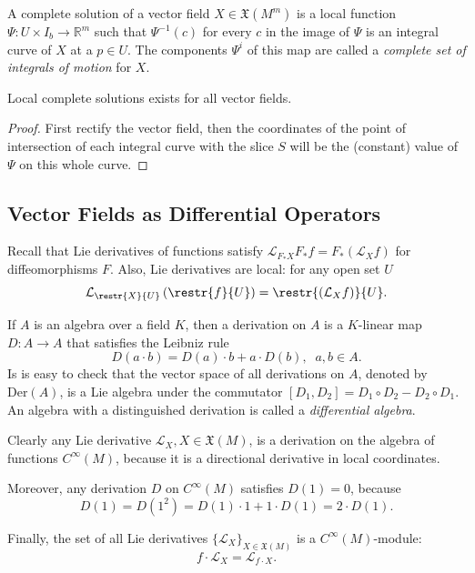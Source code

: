 \documentclass[english,letterpaper]{article}%
\numberwithin{equation}{section}
\numberwithin{figure}{section}
\numberwithin{table}{section}
\theoremstyle{definition}
\theoremstyle{definition}
\theoremstyle{definition}
\theoremstyle{plain}
\theoremstyle{plain}
\theoremstyle{plain}
\theoremstyle{plain}
\theoremstyle{remark}
\theoremstyle{remark}
\newcommand{\Lie}{\mathcal{L}}
\newcommand{\fX}{\mathfrak{X}}
\begin{document}
\begin{defn}
A complete solution of a vector field $X\in \fX(M^m)$ is a local function $\Psi:U\times I_b\to\mathbb{R}^m$ such that $\Psi^{-1}(c)$ for every $c$ in the image of $\Psi$ is an integral curve of $X$ at a $p\in U$. The components $\Psi^i$ of this map are called a \emph{complete set of integrals of motion} for $X$.
\end{defn}
\begin{prop}
Local complete solutions exists for all vector fields.
\end{prop}
\begin{proof}
First rectify the vector field, then the coordinates of the point of intersection of each integral curve with the slice $S$ will be the (constant) value of $\Psi$ on this whole curve.
\end{proof}




\subsection{Vector Fields as Differential Operators}

Recall that Lie derivatives of functions satisfy $\Lie_{F_\ast X}F_\ast f=F_\ast(\Lie_X f)$ for diffeomorphisms $F$. Also, Lie derivatives are local: for any open set $U$
\[\Lie_{\restr{X}{U}}\left(\restr{f}{U}\right)=\restr{\left(\Lie_X f\right)}{U}.\]

\begin{defn}[Derivations]
If $A$ is an algebra over a field $K$, then a derivation on $A$ is a $K$-linear map $D:A\to A$ that satisfies the Leibniz rule
\[D(a\cdot b)=D(a)\cdot b+a\cdot D(b),\;\; a,b\in A.\]
Is is easy to check that the vector space of all derivations on $A$, denoted by $\mathrm{Der}(A)$, is a Lie algebra under the commutator $[D_1,D_2]=D_1\circ D_2-D_2\circ D_1$.
An algebra with a distinguished derivation is called a \emph{differential algebra}.
\end{defn}

Clearly any Lie derivative $\Lie_X, X\in\fX(M)$, is a derivation on the algebra of functions $C^\infty(M)$, because it is a directional derivative in local coordinates.

Moreover, any derivation $D$ on $C^\infty(M)$ satisfies $D(1)=0$, because
\[D(1)=D(1^2)=D(1)\cdot 1+1\cdot D(1)=2\cdot D(1).\]

Finally, the set of all Lie derivatives $\{\Lie_X\}_{X\in\fX(M)}$ is a $C^\infty(M)$-module:
\[f\cdot\Lie_X=\Lie_{f\cdot X}.\]
\end{document}
